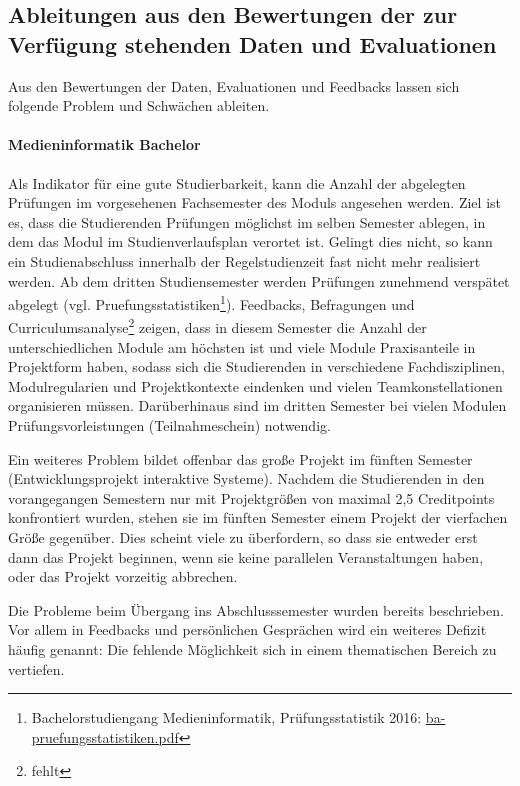 \subsection{Ableitungen aus den Bewertungen der zur Verfügung
stehenden Daten und
Evaluationen}\label{ableitungen-aus-den-bewertungen-der-zur-verfuxfcgung-stehenden-daten-und-evaluationen}

Aus den Bewertungen der Daten, Evaluationen und Feedbacks lassen sich
folgende Problem und Schwächen ableiten.

\paragraph{Medieninformatik Bachelor}\label{medieninformatik-bachelor}

Als Indikator für eine gute Studierbarkeit, kann die Anzahl der
abgelegten Prüfungen im vorgesehenen Fachsemester des Moduls angesehen
werden. Ziel ist es, dass die Studierenden Prüfungen möglichst im selben
Semester ablegen, in dem das Modul im Studienverlaufsplan verortet ist.
Gelingt dies nicht, so kann ein Studienabschluss innerhalb der
Regelstudienzeit fast nicht mehr realisiert werden. Ab dem dritten
Studiensemester werden Prüfungen zunehmend verspätet abgelegt (vgl.
Pruefungsstatistiken\footnote{Bachelorstudiengang Medieninformatik,
  Prüfungsstatistik 2016:
  \href{../anhaenge/ba-pruefungsstatistiken.pdf}{ba-pruefungsstatistiken.pdf}}).
Feedbacks, Befragungen und Curriculumsanalyse\footnote{fehlt} zeigen,
dass in diesem Semester die Anzahl der unterschiedlichen Module am
höchsten ist und viele Module Praxisanteile in Projektform haben, sodass
sich die Studierenden in verschiedene Fachdisziplinen, Modulregularien
und Projektkontexte eindenken und vielen Teamkonstellationen
organisieren müssen. Darüberhinaus sind im dritten Semester bei vielen
Modulen Prüfungsvorleistungen (Teilnahmeschein) notwendig.

Ein weiteres Problem bildet offenbar das große Projekt im fünften
Semester (Entwicklungsprojekt interaktive Systeme). Nachdem die
Studierenden in den vorangegangen Semestern nur mit Projektgrößen von
maximal 2,5 Creditpoints konfrontiert wurden, stehen sie im fünften
Semester einem Projekt der vierfachen Größe gegenüber. Dies scheint
viele zu überfordern, so dass sie entweder erst dann das Projekt
beginnen, wenn sie keine parallelen Veranstaltungen haben, oder das
Projekt vorzeitig abbrechen.

Die Probleme beim Übergang ins Abschlusssemester wurden bereits
beschrieben. Vor allem in Feedbacks und persönlichen Gesprächen wird ein
weiteres Defizit häufig genannt: Die fehlende Möglichkeit sich in einem
thematischen Bereich zu vertiefen.

